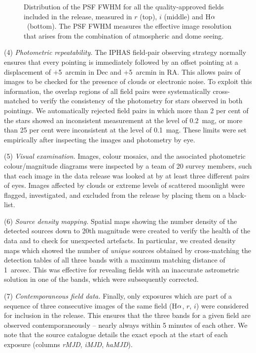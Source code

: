 \documentclass[a4paper,useAMS,usenatbib]{mn2e}
\def\ha{\mbox{H$\rm \alpha$}}
\begin{document}
\begin{figure}
\begin{minipage}[b]{\linewidth}
    \end{minipage}
    \caption{Distribution of the PSF FWHM
             for all the quality-approved fields
             included in the release,
             measured in $r$ (top), $i$ (middle) and \ha\ (bottom).
             The PSF FWHM measures the effective image resolution
             that arises from the combination of atmospheric and dome seeing.}
    \label{fig:seeing}
\end{figure}


(4) \emph{Photometric repeatability.} 
The IPHAS field-pair observing strategy normally
ensures that every pointing is immediately followed 
by an offset pointing at a displacement
of $+$5~arcmin in Dec and $+$5~arcmin in RA.
This allows pairs of images to be checked 
for the presence of clouds or electronic noise.
To exploit this information,
the overlap regions of all field pairs were systematically cross-matched
to verify the consistency of the photometry
for stars observed in both pointings.
We automatically rejected field pairs
in which more than 2 per cent of the stars 
showed an inconsistent measurement at the level of 0.2~mag,
or more than 25 per cent were inconsistent at the level of 0.1~mag.
These limits were set empirically after inspecting
the images and photometry by eye.

(5) \emph{Visual examination.}
Images, colour mosaics,
and the associated photometric colour/magnitude diagrams
were inspected by a team of 20 survey members, 
such that each image in the data release 
was looked at by at least three different pairs of eyes.
Images affected by clouds or extreme levels of scattered moonlight
were flagged, investigated,
and excluded from the release 
by placing them on a black-list.

(6) \emph{Source density mapping.}
Spatial maps showing the number density of the detected sources
down to 20th magnitude were created to verify the health
of the data and to check for unexpected artefacts.
In particular, we created density maps
which showed the number of \emph{unique} sources
obtained by cross-matching the detection tables of
all three bands with a maximum matching distance of 1~arcsec.
This was effective for revealing
fields with an inaccurate astrometric solution in one of the bands,
which were subsequently corrected.

(7) \emph{Contemporaneous field data.} 
Finally, only exposures which are part of a sequence 
of three consecutive images of the same field
(\ha, $r$, $i$)
were considered for inclusion in the release. 
This ensures that the three bands for a given field
are observed contemporaneously --  
nearly always within 5 minutes of each other.
We note that the source catalogue details the exact epoch
at the start of each exposure
(columns \emph{rMJD}, \emph{iMJD}, \emph{haMJD}).
\end{document}
